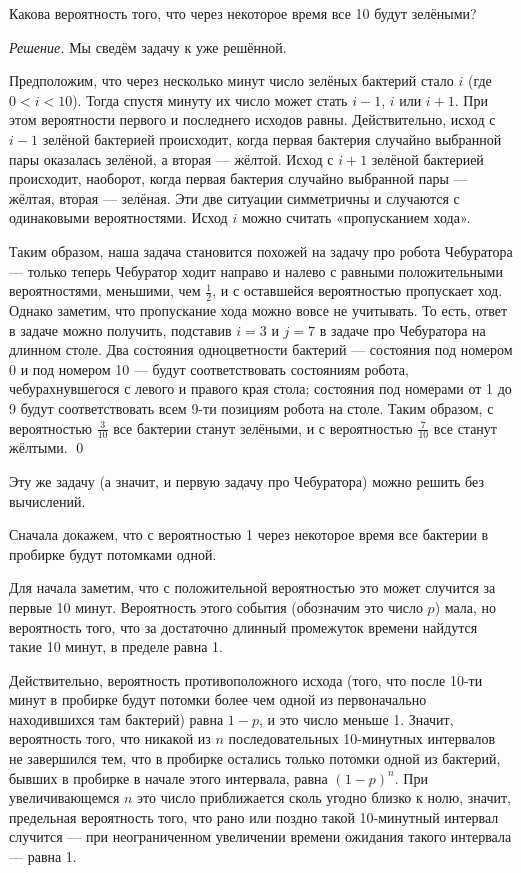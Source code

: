 \documentclass{article}
\begin{document}
Какова вероятность того, что через некоторое время все 10 будут зелёными?

\medskip
\noindent\textit{Решение.}
Мы сведём задачу к уже решённой.

Предположим, что через несколько минут 
число зелёных бактерий стало $i$ (где $0<i<10$).
Тогда спустя минуту их число может стать $i-1$, $i$ или $i+1$.
При этом вероятности первого и последнего исходов равны.
Действительно, исход с $i-1$ зелёной бактерией происходит, когда первая
бактерия случайно выбранной пары оказалась зелёной, а вторая --- жёлтой.
Исход с $i+1$ зелёной бактерией происходит, наоборот, когда первая бактерия случайно выбранной пары --- жёлтая, вторая --- зелёная. Эти две ситуации симметричны и случаются с одинаковыми вероятностями.
Исход $i$ можно считать «пропусканием хода». 

Таким образом, наша задача становится похожей на задачу про робота Чебуратора --- только теперь Чебуратор ходит направо и налево с равными положительными вероятностями, меньшими, чем $\tfrac12$, и с оставшейся вероятностью пропускает ход.
Однако заметим, что пропускание хода можно вовсе не учитывать.
То есть, ответ в задаче можно получить, подставив $i=3$ и $j=7$ в задаче про Чебуратора на длинном столе. 
Два состояния одноцветности бактерий --- состояния под номером 0 и под номером 10 --- будут соответствовать состояниям робота, чебурахнувшегося с левого и правого края стола; состояния под номерами от 1 до 9 будут соответствовать всем 9-ти позициям робота на столе.
Таким образом, с вероятностью $\tfrac{3}{10}$ все бактерии станут зелёными, 
и с вероятностью $\tfrac{7}{10}$ все станут жёлтыми.
\qed
\medskip

Эту же задачу (а значит, и первую задачу про Чебуратора)
можно решить без вычислений.

Сначала докажем, что с вероятностью 1
через некоторое время все бактерии в пробирке будут потомками одной.

Для начала заметим, что с положительной вероятностью это может случится за первые 10 минут. 
Вероятность этого события (обозначим это число $p$) мала,
но вероятность того, что за достаточно длинный промежуток времени найдутся такие 10 минут, в пределе равна 1. 

Действительно, вероятность противоположного исхода (того, что после 10-ти минут в пробирке будут потомки более чем одной из первоначально находившихся там бактерий) равна $1-p$, и это число меньше 1. 
Значит, вероятность того, что никакой из $n$ последовательных 10-минутных интервалов не завершился тем, что в пробирке остались только потомки одной из бактерий, бывших в пробирке в начале этого интервала, равна $(1-p)^n$. 
При увеличивающемся $n$ это число приближается сколь угодно близко к нолю, значит, предельная вероятность того, что рано или поздно такой 10-минутный интервал случится --- при неограниченном увеличении времени ожидания такого интервала --- равна 1. 
\end{document}
